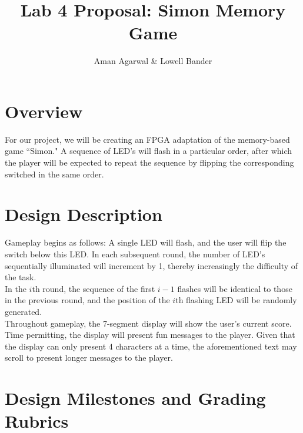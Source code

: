 \documentclass[]{article}
\newcommand{\subtitle}[1]{%
  \posttitle{%
    \par\end{center}
    \begin{center}\large#1\end{center}
    \vskip0.5em}%
}
\begin{document}
\title{Lab 4 Proposal: Simon Memory Game}
\subtitle{CS M152A}
\author{Aman Agarwal \& Lowell Bander}

\maketitle
\tableofcontents \newpage

\section{Overview}

For our project, we will be creating an FPGA adaptation of the memory-based game ``Simon." A sequence of LED's will flash in a particular order, after which the player will be expected to repeat the sequence by flipping the corresponding switched in the same order.\\

\section{Design Description}

Gameplay begins as follows: A single LED will flash, and the user will flip the switch below this LED. In each subsequent round, the number of LED's sequentially illuminated will increment by 1, thereby increasingly the difficulty of the task. \\

In the $i$th round, the sequence of the first $i-1$ flashes will be identical to those in the previous round, and the position of the $i$th flashing LED will be randomly generated.\\

Throughout gameplay, the 7-segment display will show the user's current score. Time permitting, the display will present fun messages to the player. Given that the display can only present 4 characters at a time, the aforementioned text may scroll to present longer messages to the player.

\section{Design Milestones and Grading Rubrics}
\end{document}
